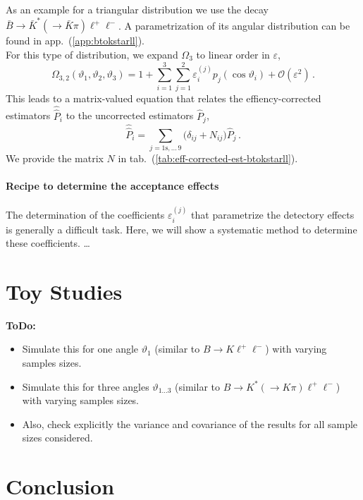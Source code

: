 \documentclass[aps,prd,reprint,nofootinbib,preprintnumbers]{revtex4}
\newcommand{\refapp}[1]{app.~(\ref{app:#1})}
\newcommand{\reftab}[1]{tab.~(\ref{tab:#1})}
\renewcommand{\theta}{\vartheta}
\newcommand{\order}[1]{\mathcal{O}\left({#1}\right)}
\let\eps\varepsilon
\newcommand{\what}[1]{\widehat{#1}}
\newcommand{\wwhat}[1]{\widehat{\widehat{#1}}}
\newcommand{\todo}[1]{{\color{red}\bf ToDo: #1}}
\begin{document}
As an example for a triangular distribution we use the decay $\bar{B}\to\bar{K}^*(\to \bar{K}\pi)\ell^+\ell^-$.
A parametrization of its angular distribution can be found in \refapp{btokstarll}.\\

For this type of distribution, we expand $\Omega_3$ to linear order in $\eps$,
\begin{equation}
    \Omega_{3,2}(\theta_1,\theta_2,\theta_3) = 1 + \sum_{i=1}^3 \sum_{j=1}^2 \eps_i^{(j)} p_j(\cos\theta_i) + \order{\eps^2}\,.
\end{equation}
This leads to a matrix-valued equation that relates the effiency-corrected estimators $\wwhat{P}_i$ to the uncorrected
estimators $\what{P}_j$,
\begin{equation}
    \label{eq:eff-corrected-est-btokstarll}
    \wwhat{P}_i = \sum_{j=1\text{s},\dots\,9} \big(\delta_{ij} + N_{ij}\big) \what{P}_j\,.
\end{equation}
We provide the matrix $N$ in \reftab{eff-corrected-est-btokstarll}.\\

\paragraph{Recipe to determine the acceptance effects}

The determination of the coefficients $\eps_i^{(j)}$ that parametrize the detectory effects is generally
a difficult task. Here, we will show a systematic method to determine these coefficients. \dots


\section{Toy Studies}
\label{sec:numerics}

\todo{
\begin{itemize}
    \item Simulate this for one angle $\theta_{1}$ (similar to $B\to K \ell^+\ell^-$) with varying samples sizes.
    \item Simulate this for three angles $\theta_{1\dots 3}$ (similar to $B\to K^*(\to K \pi)\ell^+\ell^-$) with varying samples sizes.
    \item Also, check explicitly the variance and covariance of the results for all sample sizes considered.
\end{itemize}}


\section{Conclusion}
\end{document}
